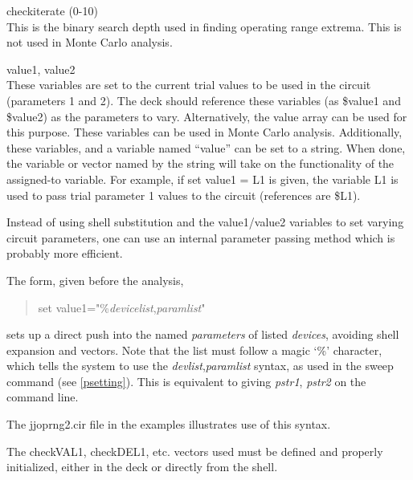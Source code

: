 \begin{description}
\item{{\et checkiterate} (0-10)}\\
This is the binary search depth used in finding operating range
extrema.  This is not used in Monte Carlo analysis.

\item{\et value1, value2}\\
These variables are set to the current trial values to be used in the
circuit (parameters 1 and 2).  The {\WRspice} deck should reference
these variables (as {\vt \$value1} and {\vt \$value2}) as the
parameters to vary.  Alternatively, the value array can be used for
this purpose.  These variables can be used in Monte Carlo analysis. 
Additionally, these variables, and a variable named ``{\vt value}''
can be set to a string.  When done, the variable or vector named by
the string will take on the functionality of the assigned-to variable. 
For example, if {\vt set value1 = L1} is given, the variable {\vt L1}
is used to pass trial parameter 1 values to the circuit (references
are {\vt \$L1}).

Instead of using shell substitution and the {\vt value1}/{\vt value2}
variables to set varying circuit parameters, one can use an internal
parameter passing method which is probably more efficient.
 
The form, given before the analysis,
\begin{quote}
{\vt set value1="\%}{\it devicelist\/}{\vt ,}{\it paramlist\/}{\vt "}
\end{quote}
sets up a direct push into the named {\it parameters} of listed {\it
devices}, avoiding shell expansion and vectors.  Note that the list
must follow a magic `{\vt \%}' character, which tells the system to
use the {\it devlist\/},{\it paramlist} syntax, as used in the {\cb
sweep} command (see \ref{psetting}).  This is equivalent to giving
{\it pstr1\/}, {\it pstr2} on the command line.

The {\vt jjoprng2.cir} file in the examples illustrates use of this
syntax.

\end{description}

The {\et checkVAL1}, {\et checkDEL1}, etc.  vectors used must be
defined and properly initialized, either in the deck or directly from
the shell.

